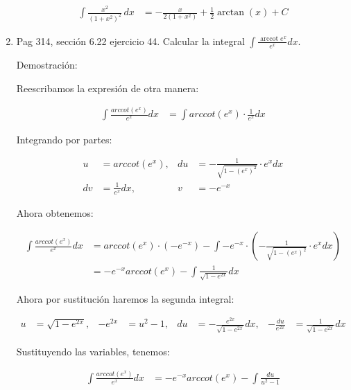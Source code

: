 \documentclass{report}
\begin{document}
\begin{enumerate}
        \begin{align*}
        \int{\frac{x^2}{(1+x^2)^2}\,dx} &= -\frac{x}{2(1+x^2)} + \frac{1}{2}\arctan(x) + C
        \end{align*}
        
        \item Pag 314, sección 6.22 ejercicio 44. Calcular la integral $\int \frac{\operatorname{arccot} e^{x}}{e^{x}} d x$.
        
        Demostración:
        
        Reescribamos la expresión de otra manera:
        
        \begin{align*}
        \int{\frac{arccot{\left(e^x\right)}}{e^x}dx} &= \int{arccot{\left(e^x\right)}\cdot\frac{1}{e^x}dx}
        \end{align*}
        
        Integrando por partes:
        
        \begin{align*}
        u&=arccot{\left(e^x\right)}, &du&=-\frac{1}{\sqrt{1-\left(e^x\right)^2}}\cdot e^xdx \\
        dv&=\frac{1}{e^x}dx, &v&=-e^{-x}
        \end{align*}
        
        Ahora obtenemos:
        
        \begin{align*}
        \int{\frac{arccot{\left(e^x\right)}}{e^x}dx} &= arccot{\left(e^x\right)}\cdot(-e^{-x}) - \int{-e^{-x}\cdot\left(-\frac{1}{\sqrt{1-\left(e^x\right)^2}}\cdot e^xdx\right)} \\
        &= -e^{-x}arccot{\left(e^x\right)} - \int{\frac{1}{\sqrt{1-e^{2x}}}dx}
        \end{align*}
        
        Ahora por sustitución haremos la segunda integral:
        
        \begin{align*}
        u&=\sqrt{1-e^{2x}}, &-e^{2x}&=u^2-1, &du&=-\frac{e^{2x}}{\sqrt{1-e^{2x}}}dx, &-\frac{du}{e^{2x}}&=\frac{1}{\sqrt{1-e^{2x}}}dx
        \end{align*}
        
        Sustituyendo las variables, tenemos:
        
        \begin{align*}
        \int{\frac{arccot{\left(e^x\right)}}{e^x}dx} &= -e^{-x}arccot{\left(e^x\right)} - \int{\frac{du}{u^2-1}}
        \end{align*}
        

\end{enumerate}
\end{document}
